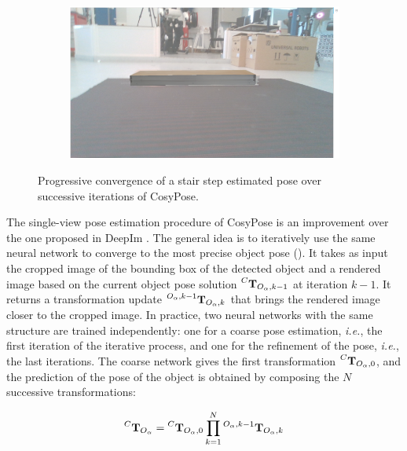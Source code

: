 \begin{figure}[]
    \label{fig:fig}
    \begin{subfigure}{\textwidth}
        \centering
        \includegraphics[width=.45\linewidth]{figures/convergence_3.png}   %
        
    \end{subfigure}
    \caption{\label{fig:cosypose-convergence} Progressive convergence of a stair step estimated pose over successive iterations of CosyPose.}
\end{figure}


The single-view pose estimation procedure of CosyPose is an improvement over the one proposed in DeepIm \cite{deepim_2019}. The general idea is to iteratively 
use the same neural network to converge to the most precise object pose (). It takes as input the cropped image of the bounding 
box of the detected object and a rendered image based on the current object pose solution $\prescript{C}{}{{\bf T}}_{O_{\alpha},k-1}$ at iteration $k-1$. 
It returns a transformation update $\prescript{O_{\alpha},k-1}{}{{\bf T}}_{O_{\alpha},k}$ that brings the rendered image closer to the cropped image. In practice, 
two neural networks with the same structure are trained independently: one for a coarse pose estimation, \textit{i.e.}, the first iteration of the iterative process, 
and one for the refinement of the pose, \textit{i.e.}, the last iterations. The coarse network gives the first transformation $\prescript{C}{}{{\bf T}}_{O_{\alpha},0}$, 
and the prediction of the pose of the object is obtained by composing the $N$ successive transformations:

\begin{equation}
\prescript{C}{}{{\bf T}}_{O_{\alpha}} = \prescript{C}{}{{\bf T}}_{O_{\alpha},0} \prod_{k=1}^N  \prescript{O_{\alpha},k-1}{}{{\bf T}}_{O_{\alpha},k}
\end{equation}

